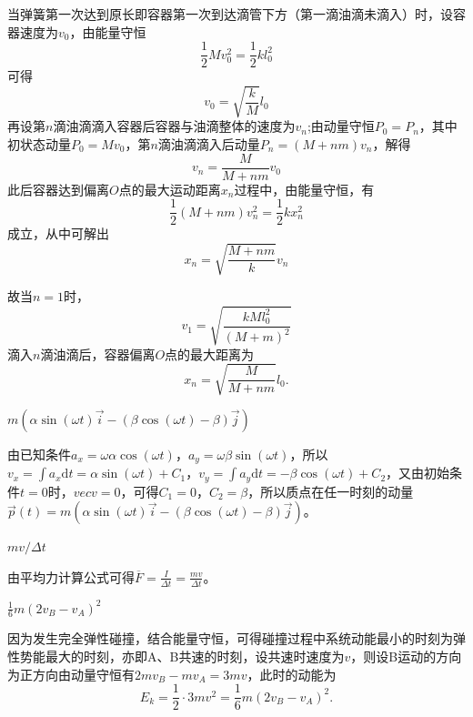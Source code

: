 \documentclass[b5paper,opensource,sourcefont,parskip]{qyxf-book}
\newcommand{\di}[1]{\mathrm{d}#1}
\begin{document}
\solve 当弹簧第一次达到原长即容器第一次到达滴管下方（第一滴油滴未滴入）时，设容器速度为$v_0$，由能量守恒
\begin{equation*}
\frac{1}{2}Mv_0^2=\frac{1}{2}kl_0^2
\end{equation*}
可得
\begin{equation*}
v_0=\sqrt{\frac{k}{M}}l_0
\end{equation*}
再设第$n$滴油滴滴入容器后容器与油滴整体的速度为$v_n$;由动量守恒$P_0=P_n$，其中初状态动量$P_0=Mv_0$，第$n$滴油滴滴入后动量$P_n=(M+nm)v_n$，解得
\begin{equation*}
v_n=\frac{M}{M+nm}v_0
\end{equation*}
此后容器达到偏离$O$点的最大运动距离$x_n$过程中，由能量守恒，有
\begin{equation*}
\frac{1}{2}(M+nm)v_n^2=\frac{1}{2}kx_n^2
\end{equation*}
成立，从中可解出
\begin{equation*}
x_n=\sqrt{\frac{M+nm}{k}}v_n
\end{equation*}

故当$n=1$时，
\begin{equation*}
v_1=\sqrt{\frac{kMl_0^2}{(M+m)^2}}
\end{equation*}
滴入$n$滴油滴后，容器偏离$O$点的最大距离为
\begin{equation*}
x_n=\sqrt{\frac{M}{M+nm}}l_0.
\end{equation*}

$m(\alpha\sin(\omega t)\vec{i}-(\beta\cos(\omega t)-\beta)\vec{j})$

\solve 由已知条件$a_x=\omega\alpha\cos(\omega t)，a_y=\omega\beta\sin(\omega t)$，所以$v_x=\int a_x\di t=\alpha\sin(\omega t)+C_1$，$v_y=\int a_y\di t=-\beta\cos(\omega t)+C_2$，又由初始条件$t=0$时，$vec{v}=0$，可得$C_1=0$，$C_2=\beta$，所以质点在任一时刻的动量$\vec{p}(t)=m(\alpha\sin(\omega t)\vec{i}-(\beta\cos(\omega t)-\beta)\vec{j})$。

$mv/\Delta t$

\solve 由平均力计算公式可得$\overline{F}=\frac{I}{\Delta t}=\frac{mv}{\Delta t}$。

$\frac{1}{6}m(2v_B-v_A)^2$

\solve 因为发生完全弹性碰撞，结合能量守恒，可得碰撞过程中系统动能最小的时刻为弹性势能最大的时刻，亦即A、B共速的时刻，设共速时速度为$v$，则设B运动的方向为正方向由动量守恒有$2mv_B-mv_A=3mv$，此时的动能为
\begin{equation*}
E_k=\frac{1}{2}\cdot 3mv^2=\frac{1}{6}m(2v_B-v_A)^2.
\end{equation*}
\end{document}
